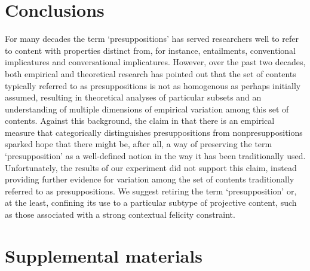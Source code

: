 \documentclass[11pt,fleqn]{article}
\newcommand{\6}{\mbox{$[\hspace*{-.6mm}[$}}
\newcommand{\9}{\mbox{$]\hspace*{-.6mm}]$}}
\begin{document}
\section{Conclusions}\label{s4}

For many decades the term `presuppositions' has served researchers well to refer to content with properties distinct from, for instance, entailments, conventional implicatures and conversational implicatures. However, over the past two decades, both empirical and theoretical research has pointed out that the set of contents typically referred to as presuppositions is not as homogenous as perhaps initially assumed, resulting in theoretical analyses of particular subsets and an understanding of multiple dimensions of empirical variation among this set of contents. Against this background, the claim in \citealt{mandelkern-etal2020} that there is an empirical measure that categorically distinguishes presuppositions from nonpresuppositions sparked hope that there might be, after all, a way of preserving the term `presupposition' as a well-defined notion in the way it has been traditionally used.  Unfortunately, the results of our experiment did not support this claim, instead providing further evidence for variation among the set of contents traditionally referred to as presuppositions. We suggest retiring the term `presupposition' or, at the least, confining its use to a particular subtype of projective content, such as those associated with a strong contextual felicity constraint.






%


\newpage

\section*{Supplemental materials}

\appendix

\setcounter{page}{1}

\setcounter{table}{0}
\renewcommand{\thetable}{A\arabic{table}}

\setcounter{figure}{0}
\renewcommand{\thefigure}{A\arabic{figure}}
\end{document}
